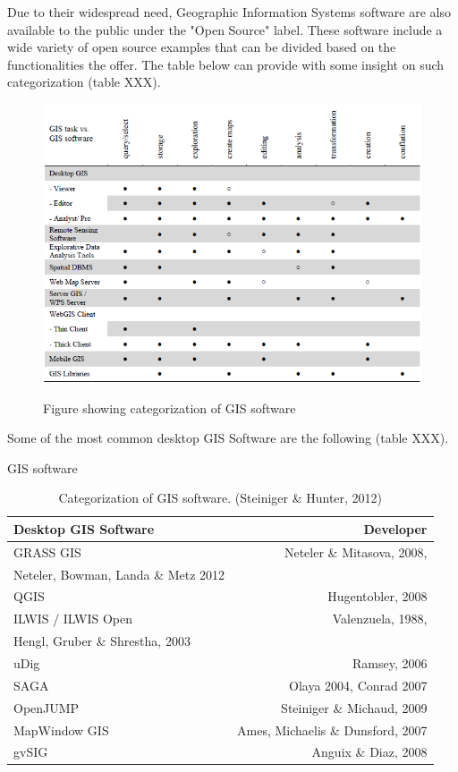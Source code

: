 Due to their widespread need, Geographic Information Systems software are also available to the public under the "Open Source" label. These software include a wide variety of open source examples that can be divided based on the functionalities the offer. The table below can provide with some insight on such categorization (table XXX).  


\begin{figure}[t]
\centering
	{\includegraphics[width=\linewidth]{gfx/OS.png}}
\caption{Figure showing categorization of GIS software}
\end{figure}
Some of the most common desktop GIS Software are the following (table XXX).

\begin{table}
\caption{GIS software}
\begin{tabular}{l | r}
Desktop GIS Software & Developer \\ 
\hline
GRASS GIS & Neteler \& Mitasova, 2008, \\ Neteler, Bowman, Landa \& Metz 2012 \\ 
\hline
QGIS & Hugentobler, 2008 \\ 
\hline
ILWIS / ILWIS Open & Valenzuela, 1988, \\ Hengl, Gruber \& Shrestha, 2003 \\ 
\hline
uDig & Ramsey, 2006 \\ 
\hline
SAGA & Olaya 2004, Conrad 2007  \\ 
\hline
OpenJUMP & Steiniger \& Michaud, 2009 \\ 
\hline
MapWindow GIS & Ames, Michaelis \& Dunsford, 2007 \\ 
\hline
gvSIG & Anguix \& Diaz, 2008 \\ 
\hline
\end{tabular}
\caption*{Categorization of GIS software. (Steiniger \& Hunter, 2012)}
\end{table}